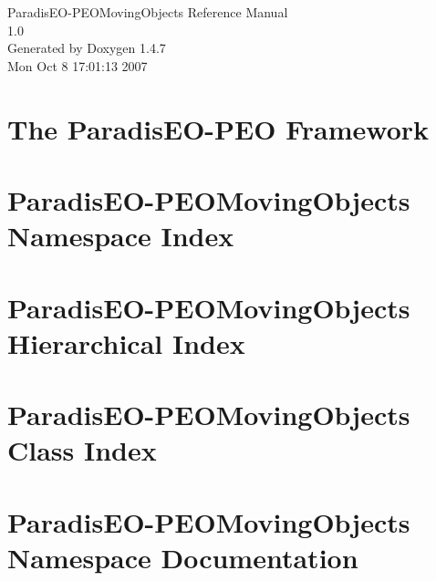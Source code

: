 \documentclass[a4paper]{book}
\begin{document}
\begin{titlepage}
\vspace*{7cm}
\begin{center}
{\Large Paradis\-EO-PEOMoving\-Objects Reference Manual\\[1ex]\large 1.0 }\\
\vspace*{1cm}
{\large Generated by Doxygen 1.4.7}\\
\vspace*{0.5cm}
{\small Mon Oct 8 17:01:13 2007}\\
\end{center}
\end{titlepage}
\clearemptydoublepage
{}
\tableofcontents
\clearemptydoublepage
{}
\chapter{The Paradis\-EO-PEO Framework }
\label{index}\hypertarget{index}{}
\chapter{Paradis\-EO-PEOMoving\-Objects Namespace Index}

\chapter{Paradis\-EO-PEOMoving\-Objects Hierarchical Index}

\chapter{Paradis\-EO-PEOMoving\-Objects Class Index}

\chapter{Paradis\-EO-PEOMoving\-Objects Namespace Documentation}

\end{document}
